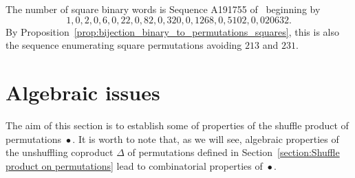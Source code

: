 \documentclass[a4paper]{llncs}
\DeclareMathOperator{\SHUFFLE}{\bullet}
\begin{document}
The number of square binary words is Sequence A191755 of~\cite{Slo}
beginning by
\begin{equation}
1, 0, 2, 0, 6, 0, 22, 0, 82, 0, 320, 0, 1268, 0, 5102, 0, 020632.
\end{equation}
By Proposition~\ref{prop:bijection_binary_to_permutations_squares}, this
is also the sequence enumerating square permutations avoiding $213$
and $231$.
\medskip


\section{Algebraic issues}
\label{section:Algebraic issues}
The aim of this section is to establish some of properties of the
shuffle product of permutations $\SHUFFLE$. It is worth to note that, as
we will see, algebraic properties of the unshuffling coproduct $\Delta$
of permutations defined in
Section~\ref{section:Shuffle product on permutations} lead to
combinatorial properties of $\SHUFFLE$.
\medskip
\end{document}
